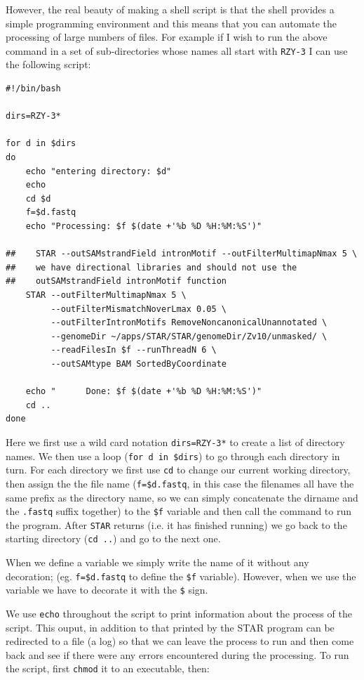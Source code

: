 \documentclass[11pt]{article}
\begin{document}
However, the real beauty of making a shell script is that the shell provides
a simple programming environment and this means that you can automate the
processing of large numbers of files. For example if I wish to run the above
command in a set of sub-directories whose names all start with \texttt{RZY-3} I can
use the following script:


\begin{verbatim}
#!/bin/bash

dirs=RZY-3*

for d in $dirs
do
    echo "entering directory: $d"
    echo 
    cd $d
    f=$d.fastq
    echo "Processing: $f $(date +'%b %D %H:%M:%S')" 

##    STAR --outSAMstrandField intronMotif --outFilterMultimapNmax 5 \
##    we have directional libraries and should not use the 
##    outSAMstrandField intronMotif function
    STAR --outFilterMultimapNmax 5 \
         --outFilterMismatchNoverLmax 0.05 \
         --outFilterIntronMotifs RemoveNoncanonicalUnannotated \
         --genomeDir ~/apps/STAR/STAR/genomeDir/Zv10/unmasked/ \
         --readFilesIn $f --runThreadN 6 \
         --outSAMtype BAM SortedByCoordinate

    echo "      Done: $f $(date +'%b %D %H:%M:%S')" 
    cd ..
done
\end{verbatim}

Here we first use a wild card notation \texttt{dirs=RZY-3*} to create a list of
directory names. We then use a loop (\texttt{for d in \$dirs}) to go through each
directory in turn. For each directory we first use \texttt{cd} to change our current
working directory, then assign the the file name (\texttt{f=\$d.fastq}, in this case
the filenames all have the same prefix as the directory name, so we can
simply concatenate the dirname and the \texttt{.fastq} suffix together) to the \texttt{\$f}
variable and then call the command to run the program. After \texttt{STAR} returns
(i.e. it has finished running) we go back to the starting directory (\texttt{cd ..})
and go to the next one.

When we define a variable we simply write the name of it without any
decoration; (eg. \texttt{f=\$d.fastq} to define the \texttt{\$f} variable). However, when we
use the variable we have to decorate it with the \texttt{\$} sign.

We use \texttt{echo} throughout the script to print
information about the process of the script. This ouput, in addition to that
printed by the STAR program can be redirected to a file (a log) so that we
can leave the process to run and then come back and see if there were any
errors encountered during the processing. To run the script, first \texttt{chmod} it
to an executable, then:
\end{document}
